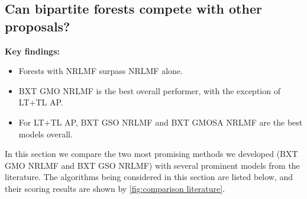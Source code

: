 %     


\subsection{Can bipartite forests compete with other proposals?}
\label{sec:comparison literature}

\begin{mdframed}
    \textbf{Key findings:}
    \begin{itemize}
        \item Forests with NRLMF surpass NRLMF alone.
        \item BXT GMO NRLMF is the best overall performer, with the exception of LT+TL AP. 
        \item For LT+TL AP, BXT GSO NRLMF and BXT GMOSA NRLMF are the best models overall.
    \end{itemize}
\end{mdframed}

In this section we compare the two most promising methods we developed (BXT GMO NRLMF and BXT GSO NRLMF) with several prominent models from the literature. 
%
The algorithms being considered in this section are listed below, and their scoring results are shown by \autoref{fig:comparison literature}.

